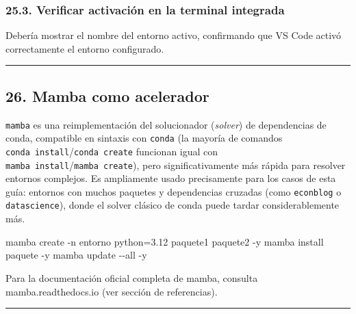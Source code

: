\documentclass[
  doc,
  floatsintext,
  longtable,
  a4paper,
  nolmodern,
  notxfonts,
  notimes,
  12pt,
  colorlinks=true,linkcolor=blue,citecolor=blue,urlcolor=blue]{apa7}
\newenvironment{Shaded}{\begin{snugshade}}{\end{snugshade}}
\newcommand{\AttributeTok}[1]{\textcolor[rgb]{0.40,0.45,0.13}{#1}}
\newcommand{\BuiltInTok}[1]{\textcolor[rgb]{0.00,0.23,0.31}{#1}}
\newcommand{\ExtensionTok}[1]{\textcolor[rgb]{0.00,0.23,0.31}{#1}}
\newcommand{\NormalTok}[1]{\textcolor[rgb]{0.00,0.23,0.31}{#1}}
\newcommand{\VariableTok}[1]{\textcolor[rgb]{0.07,0.07,0.07}{#1}}
\begin{document}
\subsubsection{25.3. Verificar activación en la terminal
integrada}\label{verificar-activaciuxf3n-en-la-terminal-integrada}

\begin{Shaded}
\end{Shaded}

Debería mostrar el nombre del entorno activo, confirmando que VS Code
activó correctamente el entorno configurado.

\begin{center}\rule{0.5\linewidth}{0.5pt}\end{center}

\subsection{26. Mamba como acelerador}\label{mamba-como-acelerador}

\texttt{mamba} es una reimplementación del solucionador (\emph{solver})
de dependencias de conda, compatible en sintaxis con \texttt{conda} (la
mayoría de comandos \texttt{conda\ install}/\texttt{conda\ create}
funcionan igual con \texttt{mamba\ install}/\texttt{mamba\ create}),
pero significativamente más rápida para resolver entornos complejos. Es
ampliamente usado precisamente para los casos de esta guía: entornos con
muchos paquetes y dependencias cruzadas (como \texttt{econblog} o
\texttt{datascience}), donde el solver clásico de conda puede tardar
considerablemente más.

\begin{Shaded}
\begin{Highlighting}[]
\ExtensionTok{mamba}\NormalTok{ create }\AttributeTok{{-}n}\NormalTok{ entorno python=3.12 paquete1 paquete2 }\AttributeTok{{-}y}
\ExtensionTok{mamba}\NormalTok{ install paquete }\AttributeTok{{-}y}
\ExtensionTok{mamba}\NormalTok{ update }\AttributeTok{{-}{-}all} \AttributeTok{{-}y}
\end{Highlighting}
\end{Shaded}

Para la documentación oficial completa de mamba, consulta
mamba.readthedocs.io (ver sección de referencias).

\begin{center}\rule{0.5\linewidth}{0.5pt}\end{center}
\end{document}
